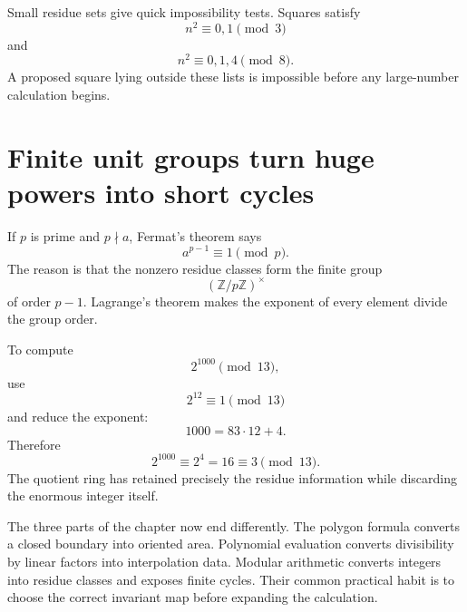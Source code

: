 Small residue sets give quick impossibility tests.  Squares satisfy
\[
  n^2\equiv0,1\pmod3
\]
and
\[
  n^2\equiv0,1,4\pmod8.
\]
A proposed square lying outside these lists is impossible before any large-number calculation begins.

\section{Finite unit groups turn huge powers into short cycles}

If \(p\) is prime and \(p\nmid a\), Fermat's theorem says
\[
  a^{p-1}\equiv1\pmod p.
\]
The reason is that the nonzero residue classes form the finite group
\[
  (\mathbb Z/p\mathbb Z)^\times
\]
of order \(p-1\).  Lagrange's theorem makes the exponent of every element divide the group order.

To compute
\[
  2^{1000}\pmod{13},
\]
use
\[
  2^{12}\equiv1\pmod{13}
\]
and reduce the exponent:
\[
  1000=83\cdot12+4.
\]
Therefore
\[
  2^{1000}\equiv2^4=16\equiv3\pmod{13}.
\]
The quotient ring has retained precisely the residue information while discarding the enormous integer itself.

The three parts of the chapter now end differently.  The polygon formula converts a closed boundary into oriented area.  Polynomial evaluation converts divisibility by linear factors into interpolation data.  Modular arithmetic converts integers into residue classes and exposes finite cycles.  Their common practical habit is to choose the correct invariant map before expanding the calculation.